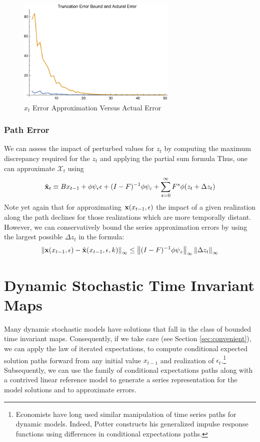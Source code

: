 \documentclass[12pt]{article}
\begin{document}
\begin{figure}
  \centering


\includegraphics[width=3in]{arbTruncErr.pdf}  
  \caption{$x_t$ Error Approximation Versus Actual Error} \label{figArbTrunc}

\end{figure}

\subsubsection{Path Error}


We can assess the impact of perturbed values for $z_t$ by computing the maximum discrepancy required for the $z_t$ and applying the 
partial sum formula
Thus, one can  approximate $\mathcal{X}_t$ using
 	 \begin{gather}
 	 \hat{\mathbf{x}}_t \equiv B x_{t-1}+ \phi \psi_\epsilon\epsilon  + (I - F)^{-1} \phi \psi_c + \sum_{s=0}^\infty F^s \phi (z_{t}+\Delta z_{t})\label{theDeltaSeries}
 \end{gather}
Note yet again that for approximating $\mathbf{x}(x_{t-1},\epsilon)$ the impact of  a given realization along the path declines for those realizations which are  more temporally distant.
However, we can conservatively bound the  series approximation  errors by using the largest possible $\Delta z_t$ in the formula:
    \begin{gather}
\left\lVert\mathbf{x}(x_{t-1},\epsilon)-\hat{\mathbf{x}}(x_{t-1},\epsilon,k)\right\rVert_\infty \le \left\lVert(I -F)^{-1} \phi \psi_z\right\rVert_\infty  \left\lVert\Delta z_t \right\rVert_\infty \label{pathErr}
    \end{gather}


\label{sec:pathnorm}

\section{Dynamic Stochastic Time Invariant Maps}
\label{sec:extToMaps}

Many dynamic stochastic models have solutions that 
fall in the class of bounded time invariant maps.
Consequently, if we take care (see Section \ref{sec:convenient}), we can apply the law of iterated expectations, 
to compute conditional expected solution paths 
forward from any initial value $x_{t-1}$
and realization of $\epsilon_t$.\footnote{Economists have long used similar manipulation of
time series paths for dynamic models. 
Indeed, Potter constructs his generalized impulse response functions using
differences in conditional expectations paths.\cite{Potter2000,Koop1996a}
}
Subsequently, we can use the family of conditional expectations paths 
along with a contrived linear reference model to generate
a series representation for the model solutions  and
to approximate errors.
\end{document}
